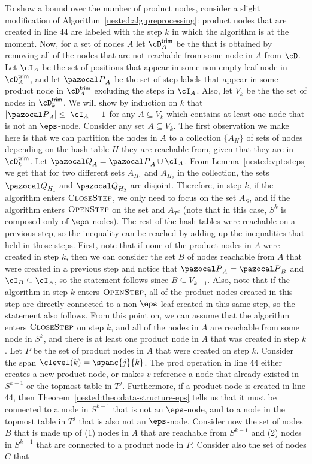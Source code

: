 To show a bound over the number of product nodes, consider a slight modification of Algorithm~\ref{nested:alg:preprocessing}: 
product nodes that are created in line 44 are labeled with the step $k$ in which the algorithm is at the moment. 
Now, for a set of nodes $A$ let $\cD^{\textsf{trim}}_A$ be the \dsepsabbr that is obtained by removing all of the nodes that are not reachable from some node in $A$ from $\cD$.
Let $\cI_A$ be the set of positions that appear in some non-empty leaf node in $\cD^{\textsf{trim}}_A$, and let ${\pazocal P}_A$ be the set of step labels that appear in some product node in $\cD^{\textsf{trim}}_A$ excluding the steps in $\cI_A$. Also, let $V_k$ be the the set of nodes in $\cD^{\textsf{trim}}_k$. We will show by induction on $k$ that $| {\pazocal P}_A | \leq | \cI_A | - 1$ for any $A\subseteq V_k$ which contains at least one node that is not an $\eps$-node. Consider any set $A \subseteq V_k$. The first observation we make here is that we can partition the nodes in $A$ to a collection $\{A_H\}$ of sets of nodes depending on the hash table $H$ they are reachable from, given that they are in $\cD^{\textsf{trim}}_k$. Let ${\pazocal Q}_A = {\pazocal P}_A \cup \cI_A$. From Lemma~\ref{nested:vpt:steps} we get that for two different sets $A_{H_1}$ and $A_{H_2}$ in the collection, the sets ${\pazocal Q}_{H_1}$ and ${\pazocal Q}_{H_2}$ are disjoint. Therefore, in step $k$, if the algorithm enters $\textsc{CloseStep}$, we only need to focus on the set $A_{S}$, and if the algorithm enters $\textsc{OpenStep}$ on the set and $A_{T^k}$ (note that in this case, $S^k$ is composed only of $\eps$-nodes). The rest of the hash tables were reachable  on a previous step, so the inequality can be reached by adding up the inequalities that held in those steps. First, note that if none of the product nodes in $A$ were created in step $k$, then we can consider the set $B$ of nodes reachable from $A$ that were created in a previous step and notice that ${\pazocal P}_A = {\pazocal P}_B$ and $\cI_B \subseteq \cI_A$, so the statement follows since $B \subseteq V_{k-1}$. Also, note that if the algorithm in step $k$ enters $\textsc{OpenStep}$, all of the product nodes created in this step are directly connected to a non-$\eps$ leaf created in this same step, so the statement also follows. From this point on, we can assume that the algorithm enters $\textsc{CloseStep}$ on step $k$, and all of the nodes in $A$ are reachable from some node in $S^k$, and there is at least one product node in $A$ that was created in step $k$. Let $P$ be the set of product nodes in $A$ that were created on step $k$. Consider the span $\clevel(k) = \spanc{j}{k}$. The \textsf{prod} operation in line 44 either creates a new product node, or makes $v$ reference a node that already existed in $S^{k-1}$ or the topmost table in $T^j$. Furthermore, if a product node is created in line 44, then Theorem~\ref{nested:theo:data-structure-eps} tells us that it must be connected to a node in $S^{k-1}$ that is not an $\eps$-node, and to a node in the topmost table in $T^j$ that is also not an $\eps$-node. Consider now the set of nodes $B$ that is made up of (1) nodes in $A$ that are reachable from $S^{k-1}$ and (2) nodes in $S^{k-1}$ that are connected to a product node in $P$. Consider also the set of nodes $C$ that 